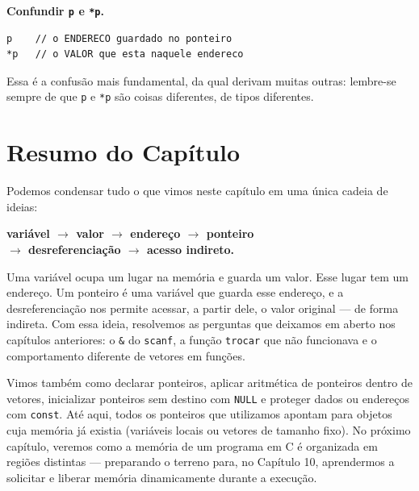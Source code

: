 \begin{errocomum}
\textbf{Confundir \texttt{p} e \texttt{*p}.}
\begin{lstlisting}
p    // o ENDERECO guardado no ponteiro
*p   // o VALOR que esta naquele endereco
\end{lstlisting}
Essa é a confusão mais fundamental, da qual derivam muitas outras: lembre-se sempre de que \texttt{p} e \texttt{*p} são coisas diferentes, de tipos diferentes.
\end{errocomum}

\section*{Resumo do Capítulo}

Podemos condensar tudo o que vimos neste capítulo em uma única cadeia de ideias:

\begin{center}
\textbf{variável $\rightarrow$ valor $\rightarrow$ endereço $\rightarrow$ ponteiro} \\
\textbf{$\rightarrow$ desreferenciação $\rightarrow$ acesso indireto.}
\end{center}

Uma variável ocupa um lugar na memória e guarda um valor. Esse lugar tem um endereço. Um ponteiro é uma variável que guarda esse endereço, e a desreferenciação nos permite acessar, a partir dele, o valor original — de forma indireta. Com essa ideia, resolvemos as perguntas que deixamos em aberto nos capítulos anteriores: o \texttt{\&} do \texttt{scanf}, a função \texttt{trocar} que não funcionava e o comportamento diferente de vetores em funções.

Vimos também como declarar ponteiros, aplicar aritmética de ponteiros dentro de vetores, inicializar ponteiros sem destino com \texttt{NULL} e proteger dados ou endereços com \texttt{const}. Até aqui, todos os ponteiros que utilizamos apontam para objetos cuja memória já existia (variáveis locais ou vetores de tamanho fixo). No próximo capítulo, veremos como a memória de um programa em C é organizada em regiões distintas — preparando o terreno para, no Capítulo 10, aprendermos a solicitar e liberar memória dinamicamente durante a execução.

